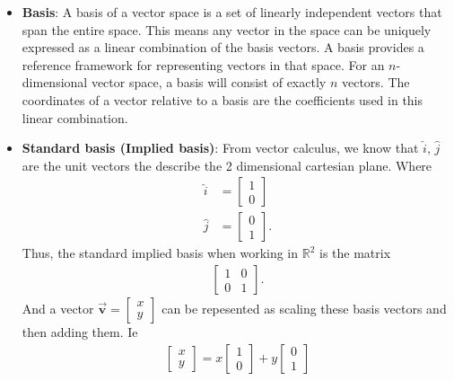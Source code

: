 \documentclass{report}
\begin{document}
    \begin{itemize}
        \item \textbf{Basis}: A basis of a vector space is a set of linearly independent vectors that span the entire space. This means any vector in the space can be uniquely expressed as a linear combination of the basis vectors. A basis provides a reference framework for representing vectors in that space.
            \bigbreak \noindent 
            For an $n$-dimensional vector space, a basis will consist of exactly $n$ vectors. The coordinates of a vector relative to a basis are the coefficients used in this linear combination.
        \item \textbf{Standard basis (Implied basis)}: From vector calculus, we know that $\hat{i}$, $\hat{j}$ are the unit vectors the describe the 2 dimensional cartesian plane. Where
            \begin{align*}
                \hat{i} &= \begin{bmatrix} 1 \\ 0 \end{bmatrix} \\
                \hat{j} &= \begin{bmatrix} 0 \\ 1 \end{bmatrix}
            .\end{align*}
            Thus, the standard implied basis when working in $\mathbb{R}^{2}$ is the matrix
            \begin{align*}
                \begin{bmatrix} 1 & 0 \\ 0 & 1\end{bmatrix}
            .\end{align*}
            And a vector $\vec{\mathbf{v}} = \begin{bmatrix} x \\ y \end{bmatrix} $ can be repesented as scaling these basis vectors and then adding them. Ie
            \begin{align*}
                \begin{bmatrix} x \\ y \end{bmatrix} = x \begin{bmatrix} 1 \\ 0\end{bmatrix} + y \begin{bmatrix} 0 \\ 1 \end{bmatrix}

\end{align*}
\end{itemize}
\end{document}
